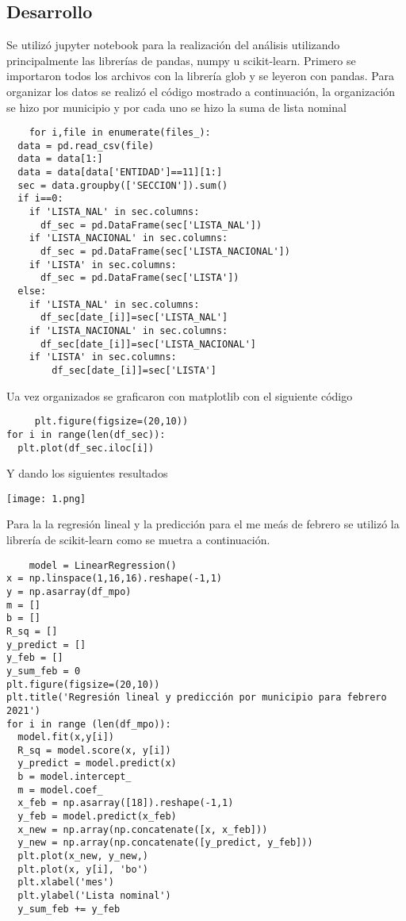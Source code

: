 \documentclass[12pt]{article}
\begin{document}
\subsection{Desarrollo}
Se utilizó jupyter notebook para la realización del análisis utilizando principalmente las librerías de pandas, numpy u scikit-learn. Primero se importaron todos los archivos con la librería glob y se leyeron con pandas.
Para organizar los datos se realizó el código mostrado a continuación, la organización se hizo por municipio y por cada uno se hizo la suma de lista nominal
\begin{verbatim}
    for i,file in enumerate(files_):
  data = pd.read_csv(file)
  data = data[1:]
  data = data[data['ENTIDAD']==11][1:]
  sec = data.groupby(['SECCION']).sum()
  if i==0:
    if 'LISTA_NAL' in sec.columns:
      df_sec = pd.DataFrame(sec['LISTA_NAL'])
    if 'LISTA_NACIONAL' in sec.columns:
      df_sec = pd.DataFrame(sec['LISTA_NACIONAL'])
    if 'LISTA' in sec.columns:
      df_sec = pd.DataFrame(sec['LISTA'])
  else:
    if 'LISTA_NAL' in sec.columns:
      df_sec[date_[i]]=sec['LISTA_NAL']
    if 'LISTA_NACIONAL' in sec.columns:
      df_sec[date_[i]]=sec['LISTA_NACIONAL']
    if 'LISTA' in sec.columns:
        df_sec[date_[i]]=sec['LISTA']
\end{verbatim}

Ua vez organizados se graficaron con matplotlib con el siguiente código 
 \begin{verbatim}
     plt.figure(figsize=(20,10))
for i in range(len(df_sec)):
  plt.plot(df_sec.iloc[i])
 \end{verbatim}
 
Y dando los siguientes resultados\par
\texttt{[image: 1.png]}\par
Para la la regresión lineal y la predicción para el me meás de febrero se utilizó la librería de scikit-learn como se muetra a continuación.
\begin{verbatim}
    model = LinearRegression()
x = np.linspace(1,16,16).reshape(-1,1)
y = np.asarray(df_mpo)
m = []
b = []
R_sq = []
y_predict = []
y_feb = []
y_sum_feb = 0
plt.figure(figsize=(20,10))
plt.title('Regresión lineal y predicción por municipio para febrero 2021')
for i in range (len(df_mpo)):
  model.fit(x,y[i])
  R_sq = model.score(x, y[i])
  y_predict = model.predict(x)
  b = model.intercept_
  m = model.coef_
  x_feb = np.asarray([18]).reshape(-1,1)
  y_feb = model.predict(x_feb)
  x_new = np.array(np.concatenate([x, x_feb]))
  y_new = np.array(np.concatenate([y_predict, y_feb]))
  plt.plot(x_new, y_new,)
  plt.plot(x, y[i], 'bo')
  plt.xlabel('mes')
  plt.ylabel('Lista nominal')
  y_sum_feb += y_feb
\end{verbatim}
\end{document}
